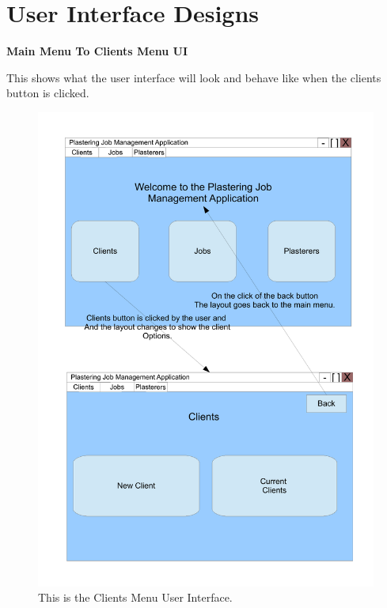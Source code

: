 \section{User Interface Designs}
\textbf{Main Menu To Clients Menu UI}
\begin{flushleft}
This shows what the user interface will look and behave like when the clients button is clicked.
\end{flushleft}
\begin{figure}[H]
\includegraphics[scale=0.5]{./Design/images/UI-ClientsMenu.pdf}
    \caption{This is the Clients Menu User Interface.} 
\label{fig:FlowChartClientsMenu}
\end{figure}

